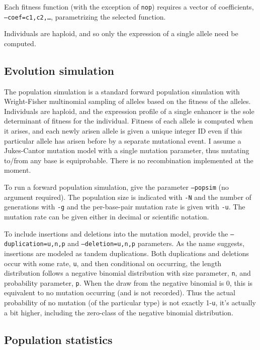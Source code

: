 \documentclass[11pt]{article}
\begin{document}
\noindent Each fitness function (with the exception of \texttt{nop}) requires a vector of coefficients, \texttt{--coef=c1,c2,\ldots}, parametrizing the selected function.

Individuals are haploid, and so only the expression of a single allele need be computed.

\subsection{Evolution simulation}

The population simulation is a standard forward population simulation with Wright-Fisher multinomial sampling of alleles based on the fitness of the alleles. Individuals are haploid, and the expression profile of a single enhancer is the sole determinant of fitness for the individual. Fitness of each allele is computed when it arises, and each newly arisen allele is given a unique integer ID even if this particular allele has arisen before by a separate mutational event. I assume a Jukes-Cantor mutation model with a single mutation parameter, thus mutating to/from any base is equiprobable. There is no recombination implemented at the moment.

To run a forward population simulation, give the parameter \texttt{--popsim} (no argument required). The population size is indicated with \texttt{-N} and the number of generations with \texttt{-g} and the per-base-pair mutation rate is given with \texttt{-u}. The mutation rate can be given either in decimal or scientific notation. 

To include insertions and deletions into the mutation model, provide the \texttt{--duplication=u,n,p} and \texttt{--deletion=u,n,p} parameters. As the name suggests, insertions are modeled as tandem duplications. Both duplications and deletions occur with some rate, \texttt{u}, and then conditional on occurring, the length distribution follows a negative binomial distribution with size parameter, \texttt{n}, and probability parameter, \texttt{p}. When the draw from the negative binomial is 0, this is equivalent to no mutation occurring (and is not recorded). Thus the actual probability of no mutation (of the particular type) is not exactly 1-\texttt{u}, it's actually a bit higher, including the zero-class of the negative binomial distribution.

\subsection{Population statistics}
\end{document}
